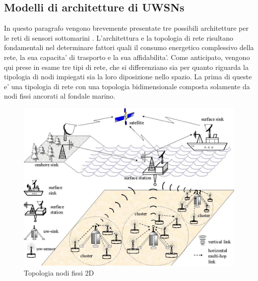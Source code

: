 \documentclass[Lau,binding=0.6cm]{sapthesis}
\begin{document}
\subsection{Modelli di architetture di UWSNs}
In questo paragrafo vengono brevemente presentate tre possibili architetture per le reti di sensori sottomarini \cite{underwater}. L'architettura e la topologia di rete risultano fondamentali nel determinare fattori quali il consumo energetico complessivo della rete, la sua capacita' di trasporto e la sua affidabilita'. \newline Come anticipato, vengono qui prese in esame tre tipi di rete, che si differenziano sia per quanto riguarda la tipologia di nodi impiegati sia la loro diposizione nello spazio.  La prima di queste e' una tipologia di rete con una topologia bidimensionale composta solamente da nodi fissi ancorati al fondale marino.

\begin{figure}[H]
    \centering
	\includegraphics[scale=0.3]{2D_arch.jpg}
	\caption{ Topologia nodi fissi 2D}
	\label{fig:}
\end{figure}
\end{document}
